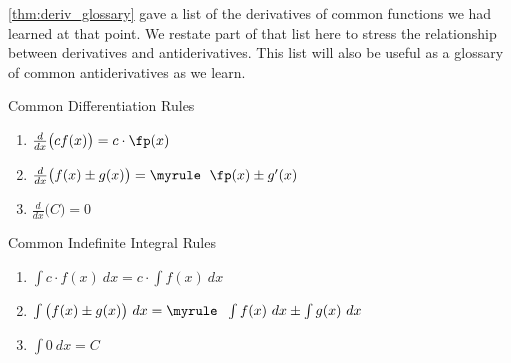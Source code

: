 \autoref{thm:deriv_glossary} gave a list of the derivatives of common functions we had learned at that point. We restate part of that list here to stress the relationship between derivatives and antiderivatives. This list will also be useful as a glossary of common antiderivatives as we learn.

{\begin{minipage}[t]{.5\specialboxlength}
Common Differentiation Rules%
\begin{enumerate}
\item\label{thm:d_const_mult_rule} \myrule$\frac{d}{dx}\big(cf(x) \big) = c\cdot \fp(x)$
\item\label{thm:d_sum_diff_rule} \myrule$\frac{d}{dx}\big(f(x)\pm g(x) \big) = \\
\myrule\phantom{.}\ \fp(x)\pm g'(x)$
\item $\frac{d}{dx}\big(C \big) = 0$\myrule
\end{enumerate}
\end{minipage}%
%
\begin{minipage}[t]{.5\specialboxlength}
Common Indefinite Integral Rules%
\begin{enumerate}
\item \myrule$\int c\cdot f(x)\ dx = c\cdot \int f(x)\ dx$
\item \myrule$\int \big(f(x)\pm g(x)\big)\ dx = \\
\myrule\phantom{.}\ \int f(x)\ dx\pm \int g(x)\ dx$
\item $\int 0\ dx = C$\myrule
\end{enumerate}
\end{minipage}
}

